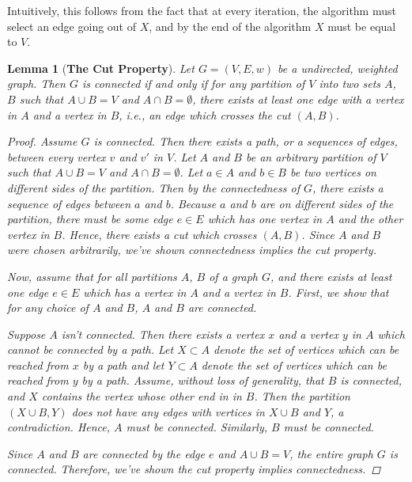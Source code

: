 \documentclass[a4paper,11pt]{report}
\theoremstyle{plain}
\newtheorem{lem}[thm]{Lemma}
\theoremstyle{definition}
\begin{document}
Intuitively, this follows from the fact that at every iteration, the algorithm
must select an edge going out of $X$, and by the end of the algorithm $X$ must
be equal to $V$.

\begin{lem}[{\bfseries The Cut Property}]
Let $G = (V, E, w)$ be a undirected, weighted graph. Then $G$ is connected
if and only if for any partition of $V$ into two sets $A$, $B$ such that
$A \cup B = V$ and $A \cap B = \emptyset$, there exists at least
one edge with a vertex in $A$ and a vertex in $B$, i.e., an edge which
crosses the cut $(A, B)$.

\begin{proof}
Assume $G$ is connected. Then there exists a path, or a sequences of edges,
between every vertex $v$ and $v'$ in $V$. Let $A$ and $B$ be an arbitrary
partition of $V$ such that $A \cup B = V$ and $A \cap B = \emptyset$.
Let $a \in A$ and $b \in B$ be two vertices on different sides of the partition.
Then by the connectedness of $G$, there exists a sequence of edges between
$a$ and $b$. Because $a$ and $b$ are on different sides of the partition, there
must be some edge $e \in E$ which has one vertex in $A$ and the other vertex in
$B$. Hence, there exists a cut which crosses $(A, B)$. Since $A$ and $B$ were
chosen arbitrarily, we've shown connectedness implies the cut property.

Now, assume that for all partitions $A$, $B$ of a graph $G$, and there
exists at least one edge $e \in E$ which has a vertex in $A$ and a vertex in
$B$. First, we show that for any choice of $A$ and $B$, $A$ and $B$ are
connected.

Suppose $A$ isn't connected. Then there exists a vertex $x$ and a vertex $y$ in
$A$ which cannot be connected by a path. Let $X \subset A$ denote the set
of vertices which can be reached from $x$ by a path and let $Y \subset A$
denote the set of vertices which can be reached from $y$ by a path. Assume,
without loss of generality, that $B$ is connected, and $X$ contains the
vertex whose other end in in $B$. Then the partition $(X \cup B, Y)$ does
not have any edges with vertices in $X \cup B$ and $Y$, a contradiction.
Hence, $A$ must be connected. Similarly, $B$ must be connected.

Since $A$ and $B$ are connected by the edge $e$ and $A \cup B = V$, the entire
graph $G$ is connected. Therefore, we've shown the cut property implies
connectedness.
\end{proof}
\end{lem}
\end{document}
